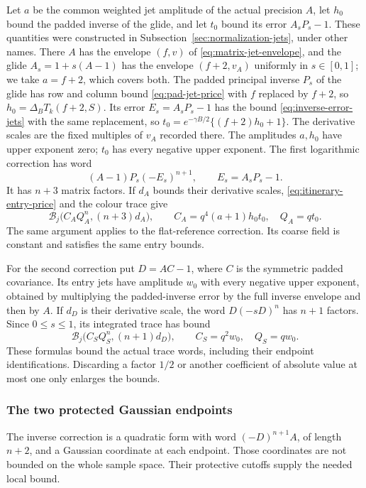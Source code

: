 Let $a$ be the common weighted jet amplitude of the actual
precision $A$, let $h_0$ bound the padded inverse of the glide,
and let $t_0$ bound its error $A_sP_s-1$. These quantities were
constructed in Subsection~\ref{sec:normalization-jets}, under other
names. There $A$ has the envelope $(f,v)$ of
\eqref{eq:matrix-jet-envelope}, and the glide $A_s=1+s(A-1)$ has the
envelope $(f+2,v_A)$ uniformly in $s\in[0,1]$; we take $a=f+2$, which
covers both. The padded principal inverse $P_s$ of the glide has row
and column bound \eqref{eq:pad-jet-price} with $f$ replaced by $f+2$,
so $h_0=\Delta_BT_k(f+2,S)$. Its error $E_s=A_sP_s-1$ has the bound
\eqref{eq:inverse-error-jets} with the same replacement, so
$t_0=e^{-\gamma B/2}\{(f+2)h_0+1\}$. The derivative scales are the
fixed multiples of $v_A$ recorded there. The amplitudes
$a,h_0$ have upper exponent zero; $t_0$ has every negative upper
exponent. The first logarithmic correction has word
\[
 (A-1)P_s(-E_s)^{n+1},\qquad E_s=A_sP_s-1.
\]
It has $n+3$ matrix factors. If $d_A$ bounds their derivative
scales, \eqref{eq:itinerary-entry-price} and the colour trace give
\begin{equation}\label{eq:itinerary-A-price}
 \mathcal B_j\bigl(C_A Q_A^n,(n+3)d_A\bigr),
 \qquad C_A=q^4(a+1)h_0t_0,\quad Q_A=qt_0.
\end{equation}
The same argument applies to the flat-reference correction.
Its coarse field is constant and satisfies the same entry bounds.

For the second correction put $D=AC-1$, where $C$ is the symmetric
padded covariance. Its entry jets have amplitude $w_0$ with every
negative upper exponent, obtained by multiplying the padded-inverse
error by the full inverse envelope and then by $A$. If $d_D$ is
their derivative scale, the word $D(-sD)^n$ has $n+1$ factors.
Since $0\le s\le1$, its integrated trace has bound
\begin{equation}\label{eq:itinerary-S-price}
 \mathcal B_j\bigl(C_S Q_S^n,(n+1)d_D\bigr),
 \qquad C_S=q^2w_0,\quad Q_S=qw_0.
\end{equation}
These formulas bound the actual trace words, including their
endpoint identifications. Discarding a factor $1/2$ or another
coefficient of absolute value at most one only enlarges the bounds.

\subsubsection{The two protected Gaussian endpoints}
The inverse correction is a quadratic form with word
$(-D)^{n+1}A$, of length $n+2$, and a Gaussian coordinate at
each endpoint. Those coordinates are not bounded on the whole
sample space. Their protective cutoffs supply the needed local
bound.


